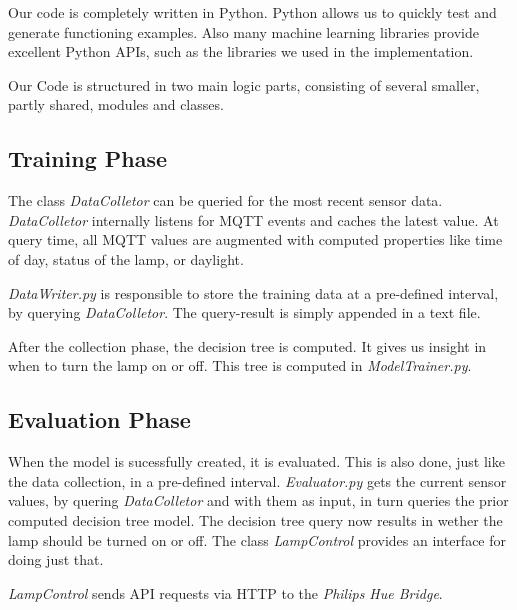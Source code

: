Our code is completely written in Python. Python allows us to quickly test and generate functioning examples. Also many machine learning libraries provide excellent Python APIs, such as the libraries we used in the implementation.

Our Code is structured in two main logic parts, consisting of several smaller, partly shared, modules and classes.


\subsection{Training Phase}

The class \emph{DataColletor} can be queried for the most recent sensor data. \emph{DataColletor} internally listens for MQTT events and caches the latest value. At query time, all MQTT values are augmented with computed properties like time of day, status of the lamp, or daylight.

\emph{DataWriter.py} is responsible to store the training data at a pre-defined interval, by querying \emph{DataColletor}. The query-result is simply appended in a text file.

After the collection phase, the decision tree is computed. It gives us insight in when to turn the lamp on or off. This tree is computed in \emph{ModelTrainer.py}.

\subsection{Evaluation Phase}

When the model is sucessfully created, it is evaluated. This is also done, just like the data collection, in a pre-defined interval. \emph{Evaluator.py} gets the current sensor values, by quering \emph{DataColletor} and with them as input, in turn queries the prior computed decision tree model. The decision tree query now results in wether the lamp should be turned on or off. The class \emph{LampControl} provides an interface for doing just that.

\emph{LampControl} sends API requests via HTTP to the \emph{Philips Hue Bridge}.